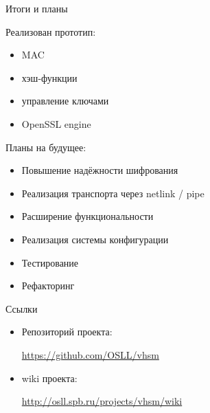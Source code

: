 \documentclass[utf8, 11pt]{beamer}
\begin{document}
\begin{frame}{Итоги и планы}

Реализован прототип:
\begin{itemize}
	\item MAC
	\item хэш-функции
	\item управление ключами
	\item OpenSSL engine
\end{itemize}

\vspace*{\fill}

Планы на будущее:
\begin{itemize}
\item Повышение надёжности шифрования
\item Реализация транспорта через netlink / pipe
\item Расширение функциональности
\item Реализация системы конфигурации
\item Тестирование
\item Рефакторинг
\end{itemize}

\vspace*{\fill}

\end{frame}

\begin{frame}{Ссылки}
\begin{itemize}
\item Репозиторий проекта:

\url{https://github.com/OSLL/vhsm}

\item wiki проекта:

\url{http://osll.spb.ru/projects/vhsm/wiki}
\end{itemize}

\vspace*{\fill}

\end{frame}
\end{document}

